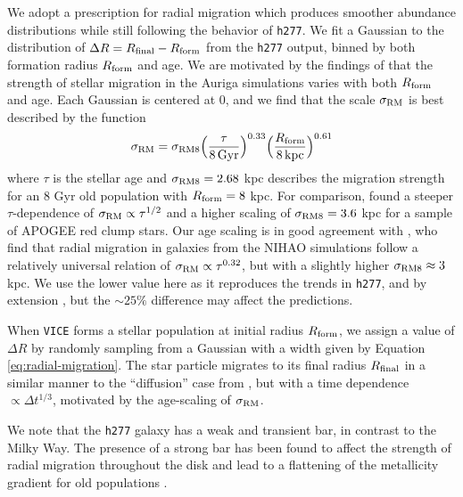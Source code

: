 \documentclass[twocolumn,twocolappendix]{aastex631}
\newcommand{\vice}{{\tt VICE}\xspace}
\newcommand{\hydro}{{\tt h277}\xspace}
\begin{document}
We adopt a prescription for radial migration which produces smoother abundance distributions while still following the behavior of \hydro. We fit a Gaussian to the distribution of $\Delta R = R_{\rm final} - R_{\rm form}$ from the \hydro output, binned by both formation radius $R_{\rm form}$ and age. We are motivated by the findings of \citet{Okalidis2022-AurigaMigration} that the strength of stellar migration in the Auriga simulations \citep{Grand2017-AurigaSims} varies with both $R_{\rm form}$ and age. Each Gaussian is centered at 0, and we find that the scale $\sigma_{\rm RM}$ is best described by the function
\begin{equation}
    \sigma_{\rm RM} = \sigma_{\rm RM8} \Big(\frac{\tau}{8\,{\rm Gyr}}\Big)^{0.33} \Big(\frac{R_{\rm form}}{8\,{\rm kpc}}\Big)^{0.61}
    \label{eq:radial-migration}
\end{equation}
where $\tau$ is the stellar age and $\sigma_{\rm RM8}=2.68$ kpc describes the migration strength for an 8 Gyr old population with $R_{\rm form}=8$ kpc. 
For comparison, \citet{Frankel2018-RadialMigration} found a steeper $\tau$-dependence of $\sigma_{\rm RM}\propto \tau^{1/2}$ and a higher scaling of $\sigma_{\rm RM8}=3.6$ kpc for a sample of APOGEE red clump stars.
Our age scaling is in good agreement with \citet{Lu2023-LMCStars}, who find that radial migration in galaxies from the NIHAO simulations \citep{Wang2015-NIHAOSims} follow a relatively universal relation of $\sigma_{\rm RM}\propto\tau^{0.32}$, but with a slightly higher $\sigma_{\rm RM8}\approx3$ kpc. We use the lower value here as it reproduces the trends in \hydro, and by extension , but the $\sim25\%$ difference may affect the predictions.

When \vice forms a stellar population at initial radius $R_{\rm form}$, we assign a value of $\Delta R$ by randomly sampling from a Gaussian with a width given by Equation \ref{eq:radial-migration}. The star particle migrates to its final radius $R_{\rm final}$ in a similar manner to the ``diffusion'' case from , but with a time dependence $\propto \Delta t^{1/3}$, motivated by the age-scaling of $\sigma_{\rm RM}$.

We note that the \hydro galaxy has a weak and transient bar, in contrast to the Milky Way. The presence of a strong bar has been found to affect the strength of radial migration throughout the disk \citep[e.g.,][]{Brunetti2011-BarredSpiralDiffusion} and lead to a flattening of the metallicity gradient for old populations \citep{Okalidis2022-AurigaMigration}.
\end{document}
